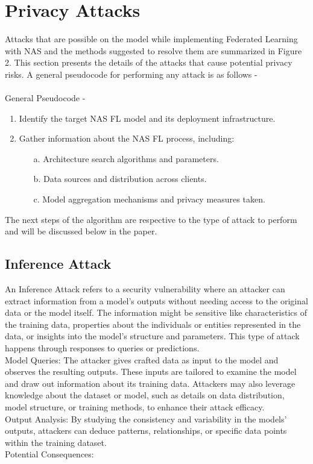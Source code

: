\documentclass[conference]{IEEEtran}
\begin{document}
\section{Privacy Attacks}
 Attacks that are possible on the model while implementing Federated Learning with NAS and the methods suggested to resolve them are summarized in Figure 2. This section presents the details of the attacks that cause potential privacy risks. A general pseudocode for performing any attack is as follows - \\
 \\
General Pseudocode - 
\begin{enumerate}
    \item Identify the target NAS FL model and its deployment infrastructure.
    \item Gather information about the NAS FL process, including:
    \begin{itemize}
        \item[a.] Architecture search algorithms and parameters.
        \item[b.] Data sources and distribution across clients.
        \item[c.] Model aggregation mechanisms and privacy measures taken.
    
        
    \end{itemize}
\end{enumerate}
The next steps of the algorithm are respective to the type of attack to perform and will be discussed below in the paper.
\subsection{Inference Attack }
An Inference Attack refers to a security vulnerability where an attacker can extract information from a model’s outputs without needing access to the original data or the model itself. The information might be sensitive like characteristics of the training data, properties about the individuals or entities represented in the data, or insights into the model's structure and parameters. This type of attack happens through responses to queries or predictions.\\ 
Model Queries: The attacker gives crafted data as input to the model and observes the resulting outputs. These inputs are tailored to examine the model and draw out information about its training data. Attackers may also leverage knowledge about the dataset or model, such as details on data distribution, model structure, or training methods, to enhance their attack efficacy. \\
Output Analysis: By studying the consistency and variability in the models’ outputs, attackers can deduce patterns, relationships, or specific data points within the training dataset.\\
Potential Consequences:
\end{document}
